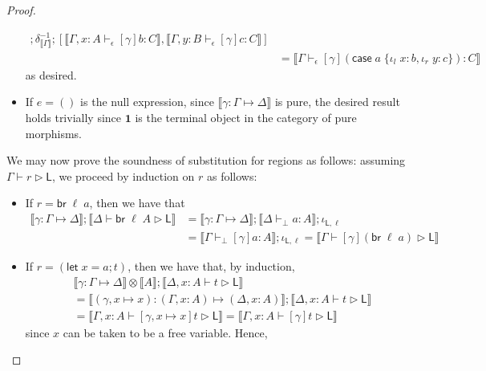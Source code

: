 \documentclass[acmsmall,screen,review]{acmart}
\newcommand{\mb}[1]{\ensuremath{\mathbf{#1}}}
\newcommand{\ms}[1]{\ensuremath{\mathsf{#1}}}
\newcommand{\lto}{:}
\newcommand{\linl}[1]{\iota_l\;{#1}}
\newcommand{\linr}[1]{\iota_r\;{#1}}
\newcommand{\caseexpr}[5]{\ms{case}\;#1\;\{\linl{#2} \lto #3, \linr{#4} \lto #5\}}
\newcommand{\letstmt}[3]{\ensuremath{\ms{let}\;#1 = #2; #3}}
\newcommand{\brb}[2]{\ms{br}\;#1\;#2}
\newcommand{\bhyp}[2]{#1 : #2}
\newcommand{\hasty}[4]{#1 \vdash_{#2} #3: {#4}}
\newcommand{\haslb}[3]{#1 \vdash #2 \rhd #3}
\newcommand{\issubst}[3]{#1: #2 \mapsto #3}
\newcommand{\dnt}[1]{\llbracket{#1}\rrbracket}
\begin{document}
\begin{proof}
\begin{itemize}[leftmargin=*]
\begin{equation}
\begin{aligned}
        ; \delta^{-1}_{\dnt{\Gamma}} 
        ; [
          \dnt{\hasty{\Gamma, \bhyp{x}{A}}{\epsilon}{[\gamma]b}{C}}, 
          \dnt{\hasty{\Gamma, \bhyp{y}{B}}{\epsilon}{[\gamma]c}{C}}
        ]
        \\ &
        = \dnt{\hasty{\Gamma}{\epsilon}{[\gamma](\caseexpr{a}{x}{b}{y}{c})}{C}}
      \end{aligned}
    \end{equation} 
    as desired.
    \item If $e = ()$ is the null expression, since $\dnt{\issubst{\gamma}{\Gamma}{\Delta}}$ is
    pure, the desired result holds trivially since $\mb{1}$ is the terminal object in the category
    of pure morphisms.
  \end{itemize}
  We may now prove the soundness of substitution for regions as follows: assuming
  $\haslb{\Gamma}{r}{\ms{L}}$, we proceed by induction on $r$ as follows:
  \begin{itemize}[leftmargin=*]
    \item If $r = \brb{\ell}{a}$, then we have that
    \begin{equation}
      \begin{aligned}
      \dnt{\issubst{\gamma}{\Gamma}{\Delta}} ; \dnt{\haslb{\Delta}{\brb{\ell}{A}}{\ms{L}}}
      &= \dnt{\issubst{\gamma}{\Gamma}{\Delta}}  
      ; \dnt{\hasty{\Delta}{\bot}{a}{A}} 
      ; \iota_{\ms{L}, \ell} \\
      &= \dnt{\hasty{\Gamma}{\bot}{[\gamma]a}{A}}
      ; \iota_{\ms{L}, \ell}
      = \dnt{\haslb{\Gamma}{[\gamma](\brb{\ell}{a})}{\ms{L}}} 
      \end{aligned}
    \end{equation}
    \item If $r = (\letstmt{x}{a}{t})$, then we have that, by induction,
    \begin{equation}
      \begin{aligned}
      & \dnt{\issubst{\gamma}{\Gamma}{\Delta}} \otimes \dnt{A} 
      ; \dnt{\haslb{\Delta, \bhyp{x}{A}}{t}{\ms{L}}}
      \\ &= \dnt{\issubst{(\gamma, x \mapsto x)}{(\Gamma, \bhyp{x}{A})}{(\Delta, \bhyp{x}{A})}}
      ; \dnt{\haslb{\Delta, \bhyp{x}{A}}{t}{\ms{L}}}
      \\ &= \dnt{\haslb{\Gamma, \bhyp{x}{A}}{[\gamma, x \mapsto x]t}{\ms{L}}}
          = \dnt{\haslb{\Gamma, \bhyp{x}{A}}{[\gamma]t}{\ms{L}}}
      \end{aligned}
    \end{equation}
    since $x$ can be taken to be a free variable. Hence,

\end{itemize}
\end{proof}
\end{document}

